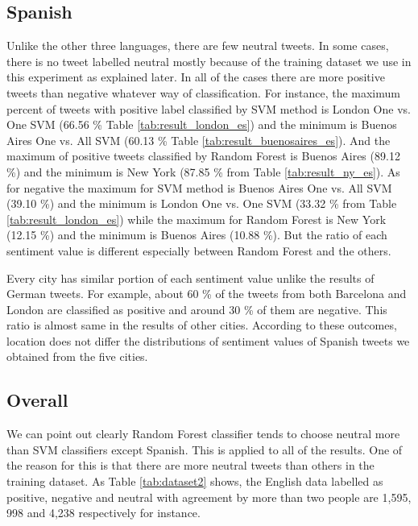 \subsection{Spanish}
Unlike the other three languages, there are few neutral tweets.
In some cases, there is no tweet labelled neutral mostly because of the training dataset we use in this experiment as explained later.
In all of the cases there are more positive tweets than negative whatever way of classification.
For instance, the maximum percent of tweets with positive label classified by SVM method is London One vs. One SVM (66.56 \% Table \ref{tab:result_london_es}) and the minimum is Buenos Aires One vs. All SVM (60.13 \% Table \ref{tab:result_buenosaires_es}).
And the maximum of positive tweets classified by Random Forest is Buenos Aires (89.12 \%) and the minimum is New York (87.85 \% from Table \ref{tab:result_ny_es}). 
As for negative the maximum for SVM method is Buenos Aires One vs. All SVM (39.10 \%) and the minimum is London One vs. One SVM (33.32 \% from Table \ref{tab:result_london_es}) while the maximum for Random Forest is New York (12.15 \%) and the minimum is Buenos Aires (10.88 \%).
But the ratio of each sentiment value is different especially between Random Forest and the others.

Every city has similar portion of each sentiment value unlike the results of German tweets.
For example, about 60 \% of the tweets from both Barcelona and London are classified as positive and around 30 \% of them are negative.
This ratio is almost same in the results of other cities.
According to these outcomes, location does not differ the distributions of sentiment values of Spanish tweets we obtained from the five cities.


\subsection{Overall}\label{sec:discussion_overall}
We can point out clearly Random Forest classifier tends to choose neutral more than SVM classifiers except Spanish.
This is applied to all of the results.
One of the reason for this is that there are more neutral tweets than others in the training dataset.
As Table \ref{tab:dataset2} shows, the English data labelled as positive, negative and neutral with agreement by more than two people are 1,595, 998 and 4,238 respectively for instance.

